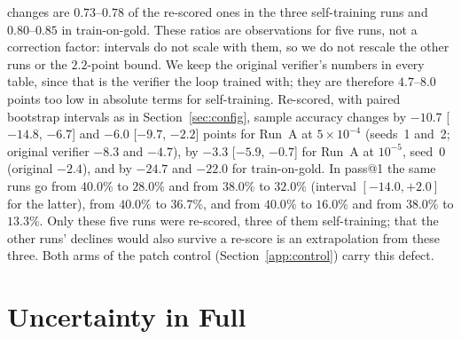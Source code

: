 \documentclass[runningheads]{llncs}
\begin{document}
changes are $0.73$--$0.78$ of the re-scored ones in the three self-training
runs and $0.80$--$0.85$ in train-on-gold. These ratios are observations for
five runs, not a correction factor: intervals do not scale with them, so we
do not rescale the other runs or the $2.2$-point bound. We keep the original verifier's numbers in
every table, since that is the verifier the loop trained with; they are
therefore $4.7$--$8.0$ points too low in absolute terms for self-training. Re-scored, with paired bootstrap intervals as in Section~\ref{sec:config},
sample accuracy changes by $-10.7$ [$-14.8$, $-6.7$] and $-6.0$ [$-9.7$, $-2.2$]
points for Run~A at $5\times10^{-4}$ (seeds~1 and~2; original verifier $-8.3$
and $-4.7$), by $-3.3$ [$-5.9$, $-0.7$] for Run~A at $10^{-5}$, seed~0 (original
$-2.4$), and by $-24.7$ and $-22.0$ for train-on-gold. In pass@1 the same runs go
from $40.0\%$ to $28.0\%$ and from $38.0\%$ to $32.0\%$ (interval $[-14.0,+2.0]$
for the latter), from $40.0\%$ to $36.7\%$, and from $40.0\%$ to $16.0\%$ and
from $38.0\%$ to $13.3\%$. Only these five runs were re-scored, three of them
self-training; that the other runs' declines would also survive a re-score is
an extrapolation from these three. Both arms of the patch control
(Section~\ref{app:control}) carry this defect.
\section{Uncertainty in Full}
\label{app:uncertainty}
\end{document}
